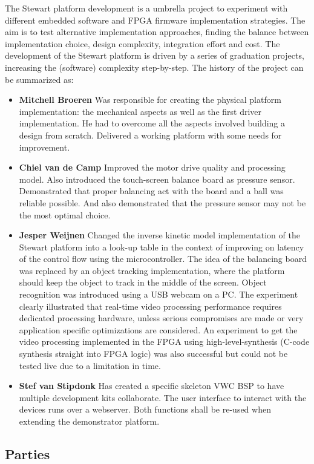 \documentclass{article}
\begin{document}
The Stewart platform development is a umbrella project to experiment with
different embedded software and FPGA firmware implementation strategies. The aim
is to test alternative implementation approaches, finding the balance between
implementation choice, design complexity, integration effort and cost. The
development of the Stewart platform is driven by a series of graduation projects,
increasing the (software) complexity step-by-step. The history of the project
can be summarized as: 
\begin{itemize} 
\item[] \textbf{Mitchell Broeren} Was
responsible for creating the physical platform implementation: the mechanical
aspects as well as the first driver implementation. He had to overcome all the
aspects involved building a design from scratch. Delivered a working platform
with some needs for improvement.
\item[]\textbf{Chiel van de
Camp} Improved the motor drive quality and processing model. Also introduced the
touch-screen balance board as pressure sensor. Demonstrated that proper
balancing act with the board and a ball was reliable possible. And also
demonstrated that the pressure sensor may not be the most optimal choice.
\item[]\textbf{Jesper Weijnen} Changed the inverse kinetic model implementation
of the Stewart platform into a look-up table in the context of improving on
latency of the control flow using the microcontroller. The idea of the balancing
board was replaced by an object tracking implementation, where the platform
should keep the object to track in the middle of the screen. Object recognition
was introduced using a USB webcam on a PC\@. The experiment clearly illustrated
that real-time video processing performance requires dedicated processing
hardware, unless serious compromises are made or very application specific
optimizations are considered. An experiment to get the video processing
implemented in the FPGA using high-level-synthesis (C-code synthesis straight
into FPGA logic) was also successful but could not be tested live due to a
limitation in time. 
\item[]\textbf{Stef van Stipdonk} Has created a specific
skeleton VWC BSP to have multiple development kits collaborate. The user
interface to interact with the devices runs over a webserver. Both functions
shall be re-used when extending the demonstrator platform. \end{itemize}
\subsection{Parties}
\end{document}
